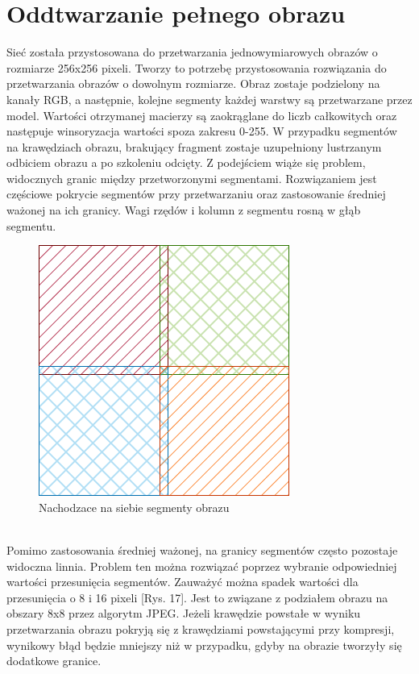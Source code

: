 \documentclass[a4paper,11pt]{article}
\begin{document}
\section{Oddtwarzanie pełnego obrazu}
Sieć została przystosowana do przetwarzania jednowymiarowych obrazów o rozmiarze 256x256 pixeli.
Tworzy to potrzebę przystosowania rozwiązania do przetwarzania obrazów o dowolnym rozmiarze.
Obraz zostaje podzielony na kanały RGB, a następnie, kolejne segmenty każdej warstwy są przetwarzane przez model.
Wartości otrzymanej macierzy są zaokrąglane do liczb całkowitych oraz następuje winsoryzacja wartości spoza zakresu 0-255.
W przypadku segmentów na krawędziach obrazu, brakujący fragment zostaje uzupełniony lustrzanym odbiciem obrazu a po szkoleniu odcięty.
Z podejściem wiąże się problem, widocznych granic między przetworzonymi segmentami.
Rozwiązaniem jest częściowe pokrycie segmentów przy przetwarzaniu oraz zastosowanie średniej ważonej na ich granicy.
Wagi rzędów i kolumn z segmentu rosną w głąb segmentu.
\\
\begin{figure}[h!]
\begin{center}
	\includegraphics[width=0.5\columnwidth]{overlap.png}
	\caption{Nachodzace na siebie segmenty obrazu}
\end{center}
\end{figure}
\\
Pomimo zastosowania średniej ważonej, na granicy segmentów często pozostaje widoczna linnia.
Problem ten można rozwiązać poprzez wybranie odpowiedniej wartości przesunięcia segmentów.
Zauważyć można spadek wartości dla przesunięcia o 8 i 16 pixeli [Rys. 17]. Jest to związane z podziałem obrazu na obszary 8x8 przez algorytm JPEG.
Jeżeli krawędzie powstałe w wyniku przetwarzania obrazu pokryją się z krawędziami powstającymi przy kompresji,
wynikowy błąd będzie mniejszy niż w przypadku, gdyby na obrazie tworzyły się dodatkowe granice.
\end{document}
